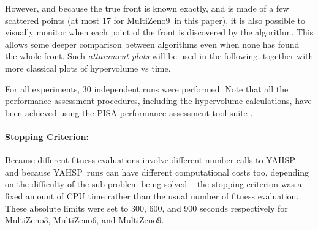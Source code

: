 \documentclass{llncs}
\newcommand{\DAEYAHSP}{{\sc DaE$_{\text{YAHSP}}$}}
\def\YAHSP{{\sc YAHSP}}
\def\MULTIZENO{{\sc MultiZeno}}
\begin{document}
However, and because the true front is known exactly, and is made of a few scattered points (at most 17 for \MULTIZENO9\ in this paper), it is also possible to visually monitor when each point of the front is discovered by the algorithm. This allows some deeper comparison between algorithms even when none has found the whole front. Such {\em attainment plots} will be used in the following, together with more classical plots of hypervolume vs time.

For all experiments, 30 independent runs were performed. Note that all the performance assessment procedures, including the hypervolume calculations, have been achieved using the PISA performance assessment tool suite \cite{Bleuler2003}. %

\paragraph{Stopping Criterion:} Because different fitness evaluations involve different number calls to \YAHSP\ -- and because \YAHSP\ runs can have different computational costs too, depending on the difficulty of the sub-problem being solved -- the stopping criterion was a fixed amount of CPU time rather than the usual number of fitness evaluation. These absolute limits were set to 300, 600, and 900 seconds respectively for  \MULTIZENO3,  \MULTIZENO6, and  \MULTIZENO9.

 
 
\end{document}
